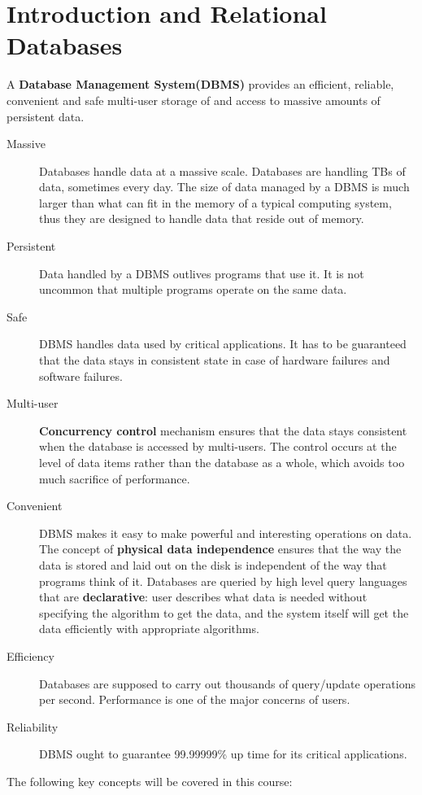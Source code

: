 \ifx\PREAMBLE\undefined


\fi
\chapter{Introduction and Relational Databases}
A \textbf{Database Management System(DBMS)} provides an efficient, reliable, convenient and safe multi-user storage of and access to massive amounts of persistent data. 
\begin{description}
\item[Massive]Databases handle data at a massive scale. Databases are handling TBs of data, sometimes every day. The size of data managed by a DBMS is much larger than what can fit in the memory of a typical computing system, thus they are designed to handle data that reside out of memory.
\item[Persistent]Data handled by a DBMS outlives programs that use it. It is not uncommon that multiple programs operate on the same data.
\item[Safe]DBMS handles data used by critical applications. It has to be guaranteed that the data stays in consistent state in case of hardware failures and software failures.
\item[Multi-user]\textbf{Concurrency control} mechanism ensures that the data stays consistent when the database is accessed by multi-users. The control occurs at the level of data items rather than the database as a whole, which avoids too much sacrifice of performance.
\item[Convenient]DBMS makes it easy to make powerful and interesting operations on data. The concept of \textbf{physical data independence} ensures that the way the data is stored and laid out on the disk is independent of the way that programs think of it. Databases are queried by high level query languages that are \textbf{declarative}: user describes what data is needed without specifying the algorithm to get the data, and the system itself will get the data efficiently with appropriate algorithms.
\item[Efficiency]Databases are supposed to carry out thousands of query/update operations per second. Performance is one of the major concerns of users.
\item[Reliability]DBMS ought to guarantee 99.99999\% up time for its critical applications. 
\end{description}
The following key concepts will be covered in this course:
